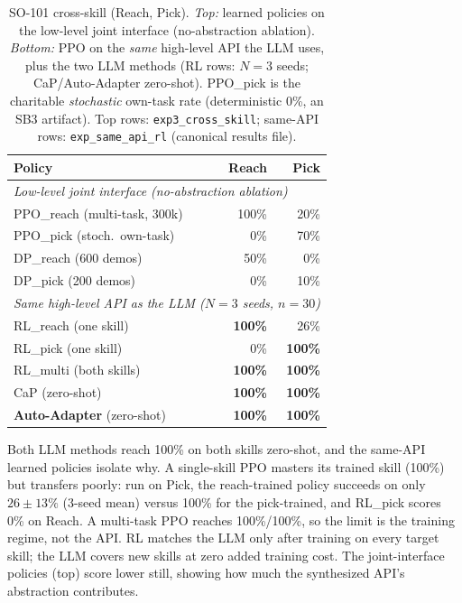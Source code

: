 \begin{table}[t]
\centering
\small
\setlength{\tabcolsep}{3pt}
\begin{tabular}{lrr}
\toprule
\textbf{Policy} & \textbf{Reach} & \textbf{Pick} \\
\midrule
\multicolumn{3}{l}{\emph{Low-level joint interface (no-abstraction ablation)}}\\
PPO\_reach (multi-task, 300k) & 100\% & 20\% \\
PPO\_pick (stoch.\ own-task)  &   0\% & 70\% \\
DP\_reach (600 demos)         &  50\% &  0\% \\
DP\_pick (200 demos)          &   0\% & 10\% \\
\midrule
\multicolumn{3}{l}{\emph{Same high-level API as the LLM ($N{=}3$ seeds, $n{=}30$)}}\\
RL\_reach (one skill)         & \textbf{100\%} & 26\% \\
RL\_pick (one skill)          &   0\% & \textbf{100\%} \\
RL\_multi (both skills)       & \textbf{100\%} & \textbf{100\%} \\
CaP (zero-shot)               & \textbf{100\%} & \textbf{100\%} \\
\textbf{Auto-Adapter} (zero-shot) & \textbf{100\%} & \textbf{100\%} \\
\bottomrule
\end{tabular}
\caption{SO-101 cross-skill (Reach, Pick). \emph{Top:} learned policies on
the low-level joint interface (no-abstraction ablation). \emph{Bottom:}
PPO on the \emph{same} high-level API the LLM uses, plus the two LLM methods
(RL rows: $N{=}3$ seeds; CaP/Auto-Adapter zero-shot). PPO\_pick is the charitable
\emph{stochastic} own-task rate (deterministic 0\%, an SB3 artifact).
Top rows: \texttt{exp3\_cross\_skill}; same-API rows: \texttt{exp\_same\_api\_rl}
(canonical results file).}
\label{tab:cross-skill}
\end{table}

Both LLM methods reach 100\% on both skills zero-shot, and the
same-API learned policies isolate why. A single-skill PPO masters its
trained skill (100\%) but transfers poorly: run on Pick, the
reach-trained policy succeeds on only $26\pm13\%$ (3-seed mean)
versus 100\% for the pick-trained, and RL\_pick scores 0\% on
Reach. A multi-task PPO reaches 100\%/100\%, so the limit is the
training regime, not the API. RL matches the LLM only after training
on every target skill; the LLM covers new skills at zero added
training cost. The joint-interface policies (top) score lower still,
showing how much the synthesized API's abstraction contributes.

